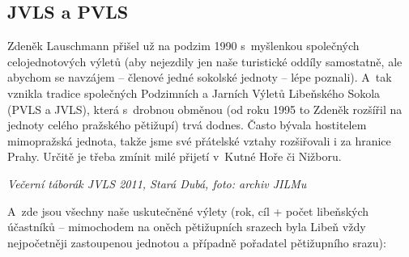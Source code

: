 \documentclass[a5paper, 12pt, twoside]{article}
\begin{document}
\subsection{JVLS a PVLS}

Zdeněk Lauschmann přišel už na podzim 1990 s~myšlenkou společných
celojednotových výletů (aby nejezdily jen naše turistické oddíly
samostatně, ale abychom se navzájem -- členové jedné sokolské jednoty --
lépe poznali). A~tak vznikla tradice společných Podzimních a Jarních
Výletů Libeňského Sokola (PVLS a JVLS), která s~drobnou obměnou (od roku
1995 to Zdeněk rozšířil na jednoty celého pražského pětižupí) trvá
dodnes. Často bývala hostitelem mimopražská jednota, takže jsme své
přátelské vztahy rozšiřovali i za hranice Prahy. Určitě je třeba zmínit
milé přijetí v~Kutné Hoře či Nižboru.


\textit{Večerní táborák JVLS 2011, Stará Dubá, foto: archiv JILMu}

A~zde jsou všechny naše uskutečněné výlety (rok, cíl + počet libeňských
účastníků -- mimochodem na oněch pětižupních srazech byla Libeň vždy
nejpočetněji zastoupenou jednotou a případně pořadatel pětižupního
srazu):
\end{document}
